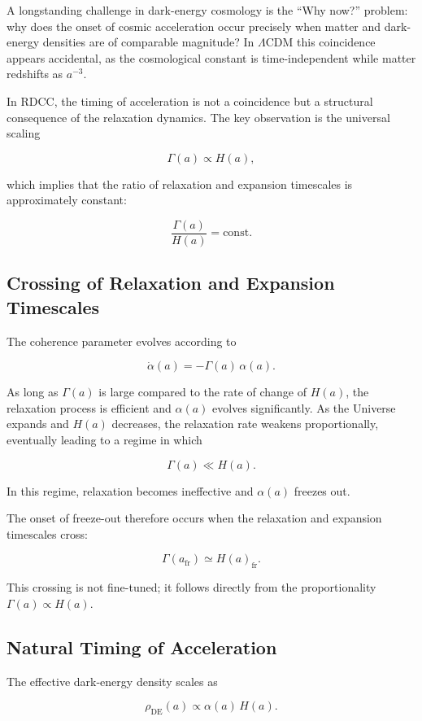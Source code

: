 \documentclass[11pt,a4paper]{article}
\newcommand{\Ha}{H(a)}
\newcommand{\GammaR}{\Gamma}
\newcommand{\alphaR}{\alpha}
\begin{document}
A longstanding challenge in dark-energy cosmology is the ``Why now?'' problem:
why does the onset of cosmic acceleration occur precisely when matter and
dark-energy densities are of comparable magnitude? In $\Lambda$CDM this
coincidence appears accidental, as the cosmological constant is time-independent
while matter redshifts as $a^{-3}$.

In RDCC, the timing of acceleration is not a coincidence but a structural
consequence of the relaxation dynamics. The key observation is the universal
scaling


\[
\GammaR(a) \propto \Ha,
\]


which implies that the ratio of relaxation and expansion timescales is
approximately constant:


\[
\frac{\GammaR(a)}{\Ha} = \mathrm{const}.
\]



\subsection{Crossing of Relaxation and Expansion Timescales}

The coherence parameter evolves according to


\[
\dot{\alphaR}(a) = -\GammaR(a)\,\alphaR(a).
\]


As long as $\GammaR(a)$ is large compared to the rate of change of $\Ha$, the
relaxation process is efficient and $\alphaR(a)$ evolves significantly. As the
Universe expands and $\Ha$ decreases, the relaxation rate weakens
proportionally, eventually leading to a regime in which


\[
\GammaR(a) \ll \Ha.
\]


In this regime, relaxation becomes ineffective and $\alphaR(a)$ freezes out.

The onset of freeze-out therefore occurs when the relaxation and expansion
timescales cross:


\[
\GammaR(a_{\mathrm{fr}}) \simeq \Ha_{\mathrm{fr}}.
\]


This crossing is not fine-tuned; it follows directly from the proportionality
$\GammaR(a) \propto \Ha$.

\subsection{Natural Timing of Acceleration}

The effective dark-energy density scales as


\[
\rho_{\mathrm{DE}}(a) \propto \alphaR(a)\,\Ha.
\]
\end{document}
